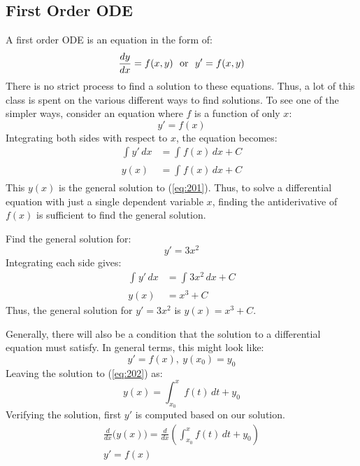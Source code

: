 \documentclass[12pt]{article}
\begin{document}
\subsection{First Order ODE}
\label{ssec:firstOrderODE}

A first order ODE is an equation in the form of:
\begin{equation}
  \frac{dy}{dx} = f(x,y) \ \ \textup{or} \ \ y' = f(x,y)
  \label{eq:201}
\end{equation}
There is no strict process to find a solution to these equations. Thus, a lot of this class is spent on the various different ways to find solutions. To see one of the simpler ways, consider an equation where $f$ is a function of only $x$:
\begin{equation*}
  y' = f(x)
\end{equation*}
Integrating both sides with respect to $x$, the equation becomes:
\begin{align*}
  \int_{}^{} y' \, dx &= \int_{}^{} f(x) \, dx + C \\
  y(x) &= \int_{}^{} f(x) \, dx + C
\end{align*}
This $y(x)$ is the general solution to (\ref{eq:201}). Thus, to solve a differential equation with just a single dependent variable $x$, finding the antiderivative of $f(x)$ is sufficient to find the general solution.
\begin{example}
  Find the general solution for:
  \begin{equation*}
    y' = 3x^2
  \end{equation*}
  Integrating each side gives:
  \begin{align*}
    \int_{}^{} y' \, dx &= \int_{}^{} 3x^2 \, dx + C \\
    y(x) &= x^3 + C
  \end{align*}
  Thus, the general solution for $y' = 3x^2$ is $y(x) = x^3 + C$.
\end{example}
Generally, there will also be a condition that the solution to a differential equation must satisfy. In general terms, this might look like:
\begin{equation}
  y' = f(x), \ y(x_0) = y_0
  \label{eq:202}
\end{equation}
Leaving the solution to (\ref{eq:202}) as:
\begin{equation*}
  y(x) = \int_{x_0}^{x} f(t) \,dt + y_0
\end{equation*}
Verifying the solution, first $y'$ is computed based on our solution.
\begin{align*}
  \frac{d}{dx}\big(y(x)\big) = \frac{d}{dx}\left(\int_{x_0}^{x} f(t) \,dt + y_0\right) \\
  y' = f(x)
\end{align*}
\end{document}
